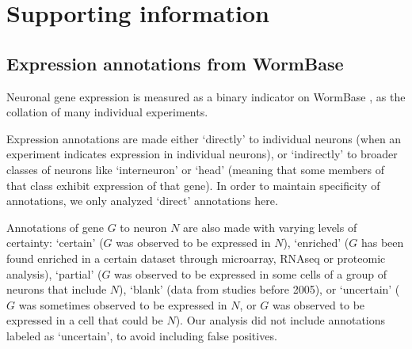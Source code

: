 \documentclass[10pt,letterpaper]{article}
\begin{document}




\newpage
\section*{Supporting information}
\setcounter{figure}{0} \renewcommand{\thefigure}{S\arabic{figure}}
\renewcommand{\thefigure}{S\arabic{figure}}

\subsection*{Expression annotations from WormBase}

Neuronal gene expression is measured as a binary indicator on WormBase \cite{Harris:2009kd}, as the collation of many individual experiments.

Expression annotations are made either `directly' to individual neurons (when an experiment indicates expression in individual neurons), or `indirectly' to broader classes of neurons like `interneuron' or `head' (meaning that some members of that class exhibit expression of that gene).
In order to maintain specificity of annotations, we only analyzed `direct' annotations here.

Annotations of gene $G$ to neuron $N$ are also made with varying levels of certainty:
`certain' ($G$ was observed to be expressed in $N$),
`enriched' ($G$ has been found enriched in a certain dataset through microarray, RNAseq or proteomic analysis),
`partial' ($G$ was observed to be expressed in some cells of a group of neurons that include $N$),
`blank' (data from studies before 2005),
or `uncertain' ($G$ was sometimes observed to be expressed in $N$, or $G$ was observed to be expressed in a cell that could be $N$).
Our analysis did not include annotations labeled as `uncertain', to avoid including false positives.
\end{document}
